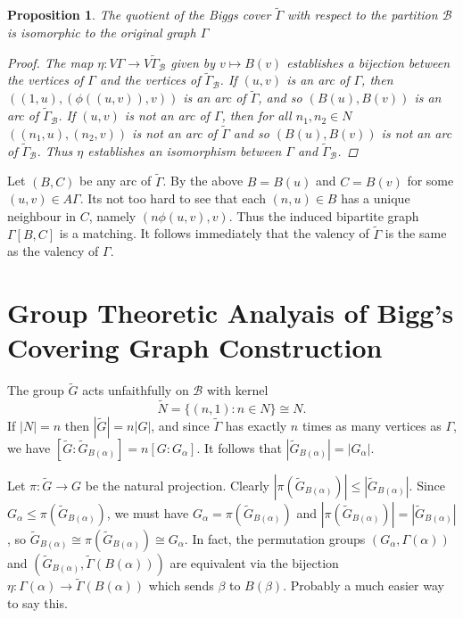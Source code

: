 \documentclass[12pt]{amsart}
\theoremstyle{plain}
\newtheorem{proposition}{Proposition}
\theoremstyle{definition}
\theoremstyle{remark}
\newcommand{\cB}{\mathcal{B}}
\begin{document}
\begin{proposition}
The quotient of the Biggs cover $\widetilde{\Gamma}$
with respect to the partition $\cB$
is isomorphic to the original graph $\Gamma$
\begin{proof}
The map $\eta : V \Gamma \to V \widetilde{\Gamma}_\cB$ given by
$v \mapsto B(v)$ establishes a bijection between the vertices of $\Gamma$
and the vertices of $\widetilde{\Gamma}_\cB$.
If $(u,v)$ is an arc of $\Gamma$, then $((1,u),(\phi((u,v)),v))$
is an arc of $\widetilde{\Gamma}$, and so $(B(u), B(v))$ 
is an arc of $\widetilde{\Gamma}_\cB$.
If $(u,v)$ is not an arc of $\Gamma$, then for all $n_1, n_2 \in N$
$((n_1, u),(n_2, v))$ is not an arc of $\widetilde{\Gamma}$
and so $(B(u), B(v))$ is not an arc of $\widetilde{\Gamma}_\cB$.
Thus $\eta$ establishes an isomorphism between
$\Gamma$ and $\widetilde{\Gamma}_\cB$.

\end{proof}
\end{proposition}

\newpage
Let $(B,C)$ be any arc of $\widetilde{\Gamma}$.
By the above $B = B(u)$ and $C = B(v)$ for some $(u,v) \in A \Gamma$.
Its not too hard to see that each $(n,u) \in B$ 
has a unique neighbour in $C$, namely $(n \phi(u,v),v)$.
Thus the induced bipartite graph $\Gamma[B,C]$ is a matching.
It follows immediately that the valency of $\widetilde{\Gamma}$
is the same as the valency of $\Gamma$. 

\section{Group Theoretic Analyais of Bigg's Covering Graph Construction}

The group $\widetilde{G}$ acts unfaithfully on $\cB$ with kernel 
$$\widetilde{N} = \{ (n,1) : n \in N \} \cong N.$$
If $|N| = n$ then $|\widetilde{G}| = n |G|$,
and since $\widetilde{\Gamma}$ has exactly $n$ times as many vertices as $\Gamma$, 
we have $[\widetilde{G} : \widetilde{G}_{B(\alpha)}] = n [G : G_\alpha]$.
It follows that 
$ |\widetilde{G}_{B(\alpha)}| = |G_\alpha|$.


Let $\pi : \widetilde{G} \to G$ be the natural projection.
Clearly $|\pi(\widetilde{G}_{B(\alpha)})| \leq |\widetilde{G}_{B(\alpha)}|$.
Since $G_\alpha \leq \pi(\widetilde{G}_{B(\alpha)})$,
we must have $G_\alpha = \pi(\widetilde{G}_{B(\alpha)})$
and $|\pi(\widetilde{G}_{B(\alpha)})| = |\widetilde{G}_{B(\alpha)}|$, 
so $\widetilde{G}_{B(\alpha)} \cong \pi(\widetilde{G}_{B(\alpha)}) \cong G_\alpha$.
In fact, the permutation groups 
$(G_\alpha, \Gamma(\alpha))$ and 
$(\widetilde{G}_{B(\alpha)}, \widetilde{\Gamma}(B(\alpha)))$
are equivalent via the bijection 
$\eta : \Gamma(\alpha) \to \widetilde{\Gamma}(B(\alpha))$
which sends $\beta$ to $B(\beta)$.
Probably a much easier way to say this.
\end{document}
